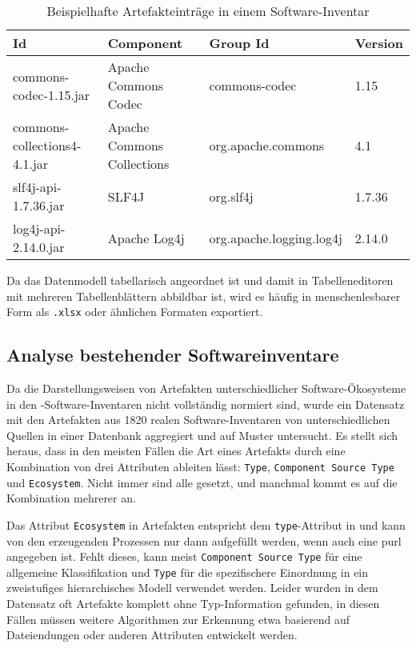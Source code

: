 \begin{table}[ht]
    \caption{Beispielhafte Artefakteinträge in einem Software-Inventar}
    \label{tab:inventory-artifact-entries}
    \centering
    \begin{tabular}{llll}
        \toprule
        \textbf{Id}                  & \textbf{Component}         & \textbf{Group Id}        & \textbf{Version} \\
        \midrule
        commons-codec-1.15.jar       & Apache Commons Codec       & commons-codec            & 1.15             \\
        commons-collections4-4.1.jar & Apache Commons Collections & org.apache.commons       & 4.1              \\
        slf4j-api-1.7.36.jar         & SLF4J                      & org.slf4j                & 1.7.36           \\
        log4j-api-2.14.0.jar         & Apache Log4j               & org.apache.logging.log4j & 2.14.0           \\
        \bottomrule
    \end{tabular}
\end{table}

Da das Datenmodell tabellarisch angeordnet ist und damit in Tabelleneditoren mit mehreren Tabellenblättern abbildbar ist, wird es häufig in menschenlesbarer Form als \texttt{.xlsx} oder ähnlichen Formaten exportiert.

\subsection{Analyse bestehender Softwareinventare}

Da die Darstellungsweisen von Artefakten unterschiedlicher Software-Ökosysteme in den \metaeffekt-Software-Inventaren nicht vollständig normiert sind, wurde ein Datensatz mit den Artefakten aus 1820 realen Software-Inventaren von unterschiedlichen Quellen in einer Datenbank aggregiert und auf Muster untersucht.
Es stellt sich heraus, dass in den meisten Fällen die Art eines Artefakts durch eine Kombination von drei Attributen ableiten lässt: \texttt{Type}, \texttt{Component Source Type} und \texttt{Ecosystem}.
Nicht immer sind alle gesetzt, und manchmal kommt es auf die Kombination mehrerer an.

Das Attribut \texttt{Ecosystem} in Artefakten entspricht dem \texttt{type}-Attribut in  und kann von den erzeugenden Prozessen nur dann aufgefüllt werden, wenn auch eine \acrshort{purl} angegeben ist.
Fehlt dieses, kann meist \texttt{Component Source Type} für eine allgemeine Klassifikation und \texttt{Type} für die spezifischere Einordnung in ein zweistufiges hierarchisches Modell verwendet werden.
Leider wurden in dem Datensatz oft Artefakte komplett ohne Typ-Information gefunden, in diesen Fällen müssen weitere Algorithmen zur Erkennung etwa basierend auf Dateiendungen oder anderen Attributen entwickelt werden.

